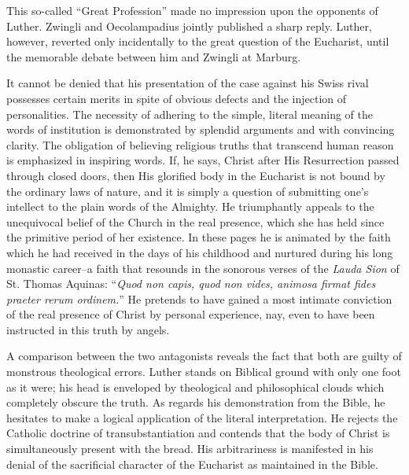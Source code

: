This so-called “Great Profession” made no impression upon the
opponents of Luther. Zwingli and Oecolampadius jointly published
a sharp reply. Luther, however, reverted only incidentally to the
great question of the Eucharist, until the memorable debate between
him and Zwingli at Marburg.

It cannot be denied that his presentation of the case against his
Swiss rival possesses certain merits in spite of obvious defects and the
injection of personalities. The necessity of adhering to the simple,
literal meaning of the words of institution is demonstrated by splendid
arguments and with convincing clarity. The obligation of believing
religious truths that transcend human reason is emphasized
in inspiring words. If, he says, Christ after His Resurrection passed
through closed doors, then His glorified body in the Eucharist is
not bound by the ordinary laws of nature, and it is simply a question
of submitting one’s intellect to the plain words of the Almighty.
He triumphantly appeals to the unequivocal belief of the Church
in the real presence, which she has held since the primitive period of
her existence. In these pages he is animated by the faith which he had
received in the days of his childhood and nurtured during his long
monastic career--a faith that resounds in the sonorous verses of the
\textit{Lauda Sion} of St. Thomas Aquinas: “\textit{Quod non capis, quod non vides,
animosa firmat fides praeter rerum ordinem.}” He pretends to have
gained a most intimate conviction of the real presence of Christ by
personal experience, nay, even to have been instructed in this truth
by angels.

A comparison between the two antagonists reveals the fact that
both are guilty of monstrous theological errors. Luther stands on
Biblical ground with only one foot as it were; his head is enveloped
by theological and philosophical clouds which completely obscure the
truth. As regards his demonstration from the Bible, he hesitates to
make a logical application of the literal interpretation. He rejects the
Catholic doctrine of transubstantiation and contends that the body of
Christ is simultaneously present with the bread. His arbitrariness is
manifested in his denial of the sacrificial character of the Eucharist as
maintained in the Bible.

